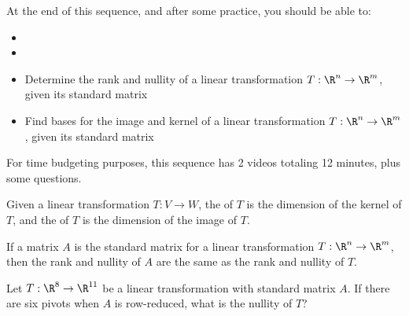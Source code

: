 







At the end of this sequence, and after some practice, you should be able to:

\begin{itemize}
\item
\item

\item Determine the rank and nullity of a linear transformation $T: \R^n \rightarrow \R^m$, given its
standard matrix
\item Find bases for the image and kernel of  a linear transformation $T: \R^n \rightarrow \R^m$, given its standard matrix
\end{itemize}


For time budgeting purposes, this sequence has 2 videos totaling 12 minutes, 
plus some questions.  




\endedxtext

\endedxvertical







{}  
Given a linear transformation $T: V\rightarrow W$, the {} of $T$ is the
dimension of the kernel of $T$, and the {} of $T$ is the
dimension of the image of $T$. 

If a matrix $A$ is the standard matrix for a linear transformation $T:\R^n \rightarrow \R^m$, 
then the rank and nullity of $A$ are the same as the rank and nullity of $T$.  


\endedxtext


\endedxvertical









Let $T: \R^{8}\rightarrow \R^{11}$ be a linear transformation with standard matrix $A$.  If 
there are six pivots when $A$ is row-reduced, what is the nullity of $T$?  


